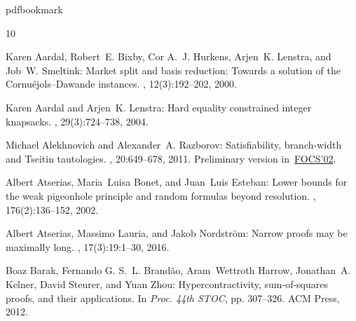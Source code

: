 \newcommand{\prelim}{Preliminary version in\ }\newcommand{\prelims}{Preliminary
  versions in\ }
\providecommand{\bibhead}[1]{}
\expandafter\ifx\csname pdfbookmark\endcsname\relax%
  \providecommand{\tocrefpdfbookmark}{}
\else\providecommand{\tocrefpdfbookmark}{%
   \hypertarget{tocreferences}{}%
   \pdfbookmark[1]{References}{tocreferences}}%
\fi

\tocrefpdfbookmark
\begin{thebibliography}{10}

\bibhead{AardalBHLS00}
{\sc Karen Aardal, Robert~E. Bixby, Cor A.~J. Hurkens, Arjen~K. Lenstra, and
  Job~W. Smeltink}: Market split and basis reduction: {T}owards a solution of
  the {C}ornu\'{e}jols--{D}awande instances.
, 12(3):192--202, 2000.

\bibhead{AardalL04}
{\sc Karen Aardal and Arjen~K. Lenstra}: Hard equality constrained integer
  knapsacks.
, 29(3):724--738, 2004.

\bibhead{AlekhnovichR02}
{\sc Michael Alekhnovich and Alexander~A. Razborov}: Satisfiability,
  branch-width and {T}seitin tautologies.
, 20:649--678, 2011.
\newblock \prelim \href{https://doi.org/10.1109/SFCS.2002.1181983}{FOCS'02}.
\newblock [\epfmtdoi{10.1007/s00037-011-0033-1}]

\bibhead{AtseriasBE02}
{\sc Albert Atserias, Maria~Luisa Bonet, and Juan~Luis Esteban}: Lower bounds
  for the weak pigeonhole principle and random formulas beyond resolution.
, 176(2):136--152, 2002.

\bibhead{AtseriasLN16}
{\sc Albert Atserias, Massimo Lauria, and Jakob Nordstr{\"{o}}m}: Narrow proofs
  may be maximally long.
, 17(3):19:1--30, 2016.
\newblock [\epfmtdoi{10.1145/2898435}]

\bibhead{BarakBHKSZ12}
{\sc Boaz Barak, Fernando G. S.~L. Brand{\~{a}}o, Aram~Wettroth Harrow,
  Jonathan~A. Kelner, David Steurer, and Yuan Zhou}: Hypercontractivity,
  sum-of-squares proofs, and their applications.
\newblock In {\em Proc. 44th STOC}, pp. 307--326. ACM Press, 2012.
\newblock [\epfmtdoi{10.1145/2213977.2214006}]


\end{thebibliography}
